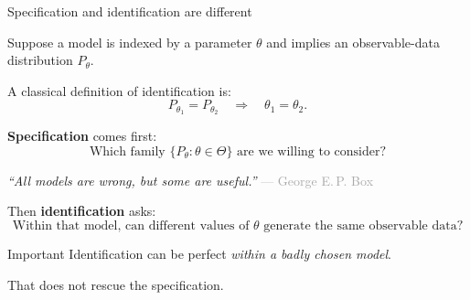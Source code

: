 \documentclass[aspectratio=169,11pt]{beamer}
\begin{document}
\begin{frame}{Specification and identification are different}

Suppose a model is indexed by a parameter $\theta$ and implies an
observable-data distribution $P_\theta$.

A classical definition of identification is:
\[
P_{\theta_1}=P_{\theta_2}
\quad\Longrightarrow\quad
\theta_1=\theta_2.
\]

\vspace{0.3em}

\pause

\textbf{Specification} comes first:
\[
\boxed{
\text{Which family } \{P_\theta:\theta\in\Theta\}
\text{ are we willing to consider?}
}
\]

\begin{center}
\textcolor{DeepBlue}{\textit{``All models are wrong, but some are useful.''}}
\quad
\textcolor{DarkGray}{--- George E.\,P. Box}
\end{center}

\pause

Then \textbf{identification} asks:
\[
\boxed{
\text{Within that model, can different values of }\theta
\text{ generate the same observable data?}
}
\]

\vspace{0.35em}

\begin{alertblock}{Important}
Identification can be perfect \emph{within a badly chosen model}.

That does not rescue the specification.
\end{alertblock}

\end{frame}
\end{document}
